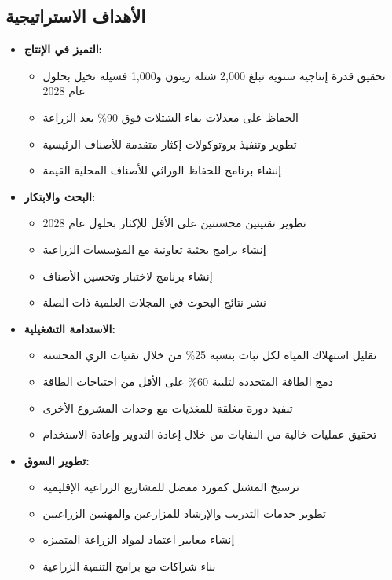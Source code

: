 \subsection{الأهداف الاستراتيجية}
\begin{itemize}
    \item \textbf{التميز في الإنتاج:}
    \begin{itemize}
        \item تحقيق قدرة إنتاجية سنوية تبلغ 2,000 شتلة زيتون و1,000 فسيلة نخيل بحلول عام 2028
        \item الحفاظ على معدلات بقاء الشتلات فوق 90\% بعد الزراعة
        \item تطوير وتنفيذ بروتوكولات إكثار متقدمة للأصناف الرئيسية
        \item إنشاء برنامج للحفاظ الوراثي للأصناف المحلية القيمة
    \end{itemize}
    
    \item \textbf{البحث والابتكار:}
    \begin{itemize}
        \item تطوير تقنيتين محسنتين على الأقل للإكثار بحلول عام 2028
        \item إنشاء برامج بحثية تعاونية مع المؤسسات الزراعية
        \item إنشاء برنامج لاختبار وتحسين الأصناف
        \item نشر نتائج البحوث في المجلات العلمية ذات الصلة
    \end{itemize}
    
    \item \textbf{الاستدامة التشغيلية:}
    \begin{itemize}
        \item تقليل استهلاك المياه لكل نبات بنسبة 25\% من خلال تقنيات الري المحسنة
        \item دمج الطاقة المتجددة لتلبية 60\% على الأقل من احتياجات الطاقة
        \item تنفيذ دورة مغلقة للمغذيات مع وحدات المشروع الأخرى
        \item تحقيق عمليات خالية من النفايات من خلال إعادة التدوير وإعادة الاستخدام
    \end{itemize}
    
    \item \textbf{تطوير السوق:}
    \begin{itemize}
        \item ترسيخ المشتل كمورد مفضل للمشاريع الزراعية الإقليمية
        \item تطوير خدمات التدريب والإرشاد للمزارعين والمهنيين الزراعيين
        \item إنشاء معايير اعتماد لمواد الزراعة المتميزة
        \item بناء شراكات مع برامج التنمية الزراعية
    \end{itemize}
\end{itemize}

